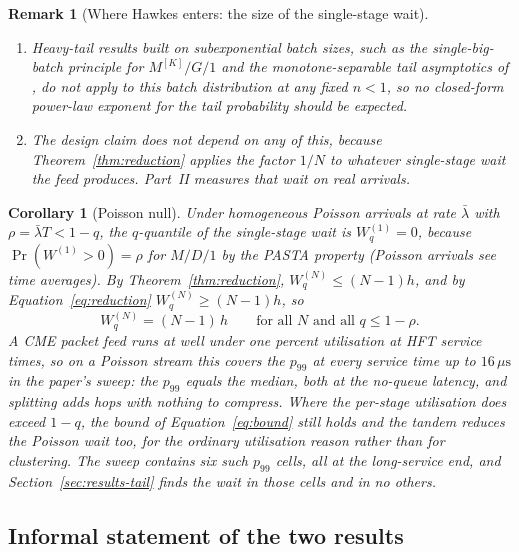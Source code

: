 \documentclass[11pt]{article}
\newtheorem{corollary}[theorem]{Corollary}
\newtheorem{remark}{Remark}[section]
\begin{document}
\begin{remark}[Where Hawkes enters: the size of the single-stage wait]
\begin{enumerate}
of magnitude above the service time and the hop cost.
    \item Heavy-tail results built on subexponential batch sizes, such as the
single-big-batch principle for $M^{[K]}/G/1$ \citep{asmussen2003} and the
monotone-separable tail asymptotics of \citet{baccellifosslelarge2005}, do not apply to
this batch distribution at any fixed $n < 1$, so no closed-form power-law exponent for the
tail probability should be expected.
    \item The design claim does not depend on any of this, because
Theorem~\ref{thm:reduction} applies the factor $1/N$ to whatever single-stage wait the
feed produces. Part~II measures that wait on real arrivals.
\end{enumerate}
\end{remark}

\begin{corollary}[Poisson null]
\label{cor:poisson}
Under homogeneous Poisson arrivals at rate $\bar\lambda$ with $\rho = \bar\lambda T < 1 -
q$, the $q$-quantile of the single-stage wait is $W_q^{(1)} = 0$, because $\Pr(W^{(1)} >
0) = \rho$ for $M/D/1$ by the PASTA property (Poisson arrivals see time averages). By Theorem~\ref{thm:reduction}, $W_q^{(N)} \le (N-1)h$,
and by Equation~\eqref{eq:reduction} $W_q^{(N)} \ge (N-1)h$, so
\begin{equation}
W_q^{(N)} = (N-1)\,h \qquad \text{for all } N \text{ and all } q \le 1 - \rho .
\label{eq:poisson-cor}
\end{equation}
A CME packet feed runs at well under one percent utilisation at HFT service times, so on
a Poisson stream this covers the $p_{99}$ at every service time up to
$16\,\mu\mathrm{s}$ in the paper's sweep: the $p_{99}$ equals the median, both at the
no-queue latency, and splitting adds hops with nothing to compress. Where the per-stage
utilisation does exceed $1 - q$, the bound of Equation~\eqref{eq:bound} still holds and
the tandem reduces the Poisson wait too, for the ordinary utilisation reason rather than
for clustering. The sweep contains six such $p_{99}$ cells, all at the long-service end,
and Section~\ref{sec:results-tail} finds the wait in those cells and in no others.
\end{corollary}

\subsection{Informal statement of the two results}
\label{sec:theory-summary}
\end{document}
